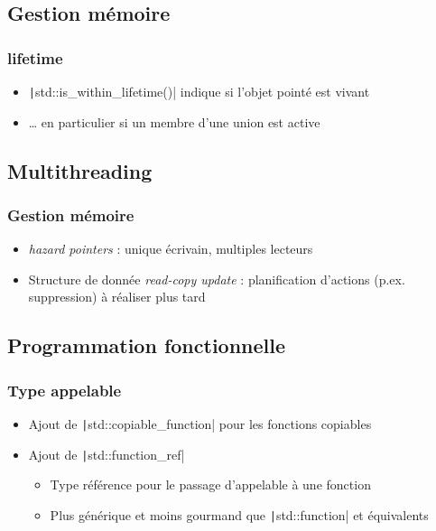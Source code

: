 \documentclass[C++.tex]{subfiles}
\begin{document}
\subsection*{Gestion mémoire}
\begin{frame}[fragile]
	\frametitle{lifetime}
	\begin{itemize}
		\item \texttt|std::is_within_lifetime()| indique si l'objet pointé est vivant
		\item \ldots{} en particulier si un membre d'une union est active
	\end{itemize}
\end{frame}

\subsection*{Multithreading}
\begin{frame}[fragile]
	\frametitle{Gestion mémoire}
	\begin{itemize}
		\item \textit{hazard pointers} : unique écrivain, multiples lecteurs
		\item Structure de donnée \textit{read-copy update} : planification d'actions (p.ex. suppression) à réaliser plus tard
	\end{itemize}
\end{frame}

\subsection*{Programmation fonctionnelle}
\begin{frame}[fragile]
	\frametitle{Type appelable}
	\begin{itemize}
		\item Ajout de \texttt|std::copiable_function| pour les fonctions copiables


		\item Ajout de \texttt|std::function_ref|
		\begin{itemize}
			\item Type référence pour le passage d'appelable à une fonction
			\item Plus générique et moins gourmand que \texttt|std::function| et équivalents
	
		\end{itemize}
	\end{itemize}
\end{frame}
\end{document}
